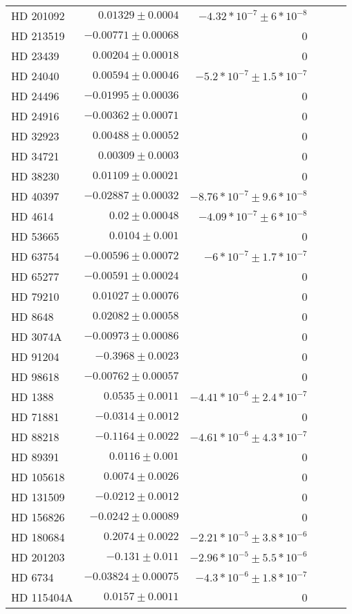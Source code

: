 \begin{longtable*}{lrrrrr}
HD 201092 & $0.01329\pm 0.0004$ & $-4.32*10^{-7}\pm 6*10^{-8}$ \\ 
HD 213519 & $-0.00771\pm 0.00068$ & 0 \\ 
HD 23439 & $0.00204\pm 0.00018$ & 0 \\ 
HD 24040 & $0.00594\pm 0.00046$ & $-5.2*10^{-7}\pm 1.5*10^{-7}$ \\ 
HD 24496 & $-0.01995\pm 0.00036$ & 0 \\ 
HD 24916 & $-0.00362\pm 0.00071$ & 0 \\ 
HD 32923 & $0.00488\pm 0.00052$ & 0 \\ 
HD 34721 & $0.00309\pm 0.0003$ & 0 \\ 
HD 38230 & $0.01109\pm 0.00021$ & 0 \\ 
HD 40397 & $-0.02887\pm 0.00032$ & $-8.76*10^{-7}\pm 9.6*10^{-8}$ \\ 
HD 4614 & $0.02\pm 0.00048$ & $-4.09*10^{-7}\pm 6*10^{-8}$ \\ 
HD 53665 & $0.0104\pm 0.001$ & 0 \\ 
HD 63754 & $-0.00596\pm 0.00072$ & $-6*10^{-7}\pm 1.7*10^{-7}$ \\ 
HD 65277 & $-0.00591\pm 0.00024$ & 0 \\ 
HD 79210 & $0.01027\pm 0.00076$ & 0 \\ 
HD 8648 & $0.02082\pm 0.00058$ & 0 \\ 
HD 3074A & $-0.00973\pm 0.00086$ & 0 \\ 
HD 91204 & $-0.3968\pm 0.0023$ & 0 \\ 
HD 98618 & $-0.00762\pm 0.00057$ & 0 \\ 
HD 1388 & $0.0535\pm 0.0011$ & $-4.41*10^{-6}\pm 2.4*10^{-7}$ \\ 
HD 71881 & $-0.0314\pm 0.0012$ & 0 \\ 
HD 88218 & $-0.1164\pm 0.0022$ & $-4.61*10^{-6}\pm 4.3*10^{-7}$ \\ 
HD 89391 & $0.0116\pm 0.001$ & 0 \\ 
HD 105618 & $0.0074\pm 0.0026$ & 0 \\ 
HD 131509 & $-0.0212\pm 0.0012$ & 0 \\ 
HD 156826 & $-0.0242\pm 0.00089$ & 0 \\ 
HD 180684 & $0.2074\pm 0.0022$ & $-2.21*10^{-5}\pm 3.8*10^{-6}$ \\ 
HD 201203 & $-0.131\pm 0.011$ & $-2.96*10^{-5}\pm 5.5*10^{-6}$ \\ 
HD 6734 & $-0.03824\pm 0.00075$ & $-4.3*10^{-6}\pm 1.8*10^{-7}$ \\ 
HD 115404A & $0.0157\pm 0.0011$ & 0 \\ 

\end{longtable*}

